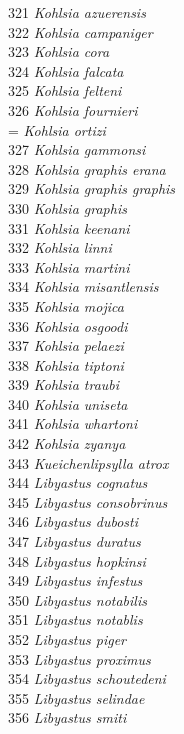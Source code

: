 \documentclass[
]{article}
\begin{document}
321 \emph{Kohlsia azuerensis}\\
322 \emph{Kohlsia campaniger}\\
323 \emph{Kohlsia cora}\\
324 \emph{Kohlsia falcata}\\
325 \emph{Kohlsia felteni}\\
326 \emph{Kohlsia fournieri}\\
= \emph{Kohlsia ortizi}\\
327 \emph{Kohlsia gammonsi}\\
328 \emph{Kohlsia graphis erana}\\
329 \emph{Kohlsia graphis graphis}\\
330 \emph{Kohlsia graphis}\\
331 \emph{Kohlsia keenani}\\
332 \emph{Kohlsia linni}\\
333 \emph{Kohlsia martini}\\
334 \emph{Kohlsia misantlensis}\\
335 \emph{Kohlsia mojica}\\
336 \emph{Kohlsia osgoodi}\\
337 \emph{Kohlsia pelaezi}\\
338 \emph{Kohlsia tiptoni}\\
339 \emph{Kohlsia traubi}\\
340 \emph{Kohlsia uniseta}\\
341 \emph{Kohlsia whartoni}\\
342 \emph{Kohlsia zyanya}\\
343 \emph{Kueichenlipsylla atrox}\\
344 \emph{Libyastus cognatus}\\
345 \emph{Libyastus consobrinus}\\
346 \emph{Libyastus dubosti}\\
347 \emph{Libyastus duratus}\\
348 \emph{Libyastus hopkinsi}\\
349 \emph{Libyastus infestus}\\
350 \emph{Libyastus notabilis}\\
351 \emph{Libyastus notablis}\\
352 \emph{Libyastus piger}\\
353 \emph{Libyastus proximus}\\
354 \emph{Libyastus schoutedeni}\\
355 \emph{Libyastus selindae}\\
356 \emph{Libyastus smiti}\\
\end{document}

